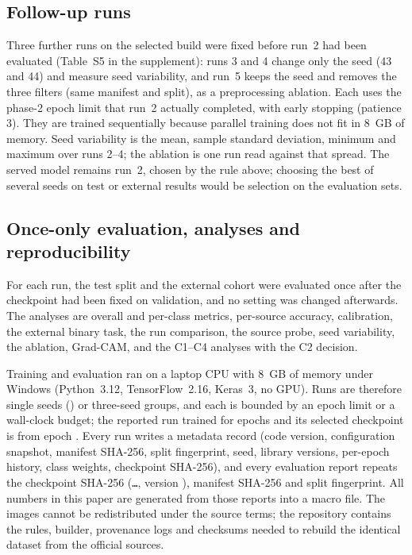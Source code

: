 \subsection{Follow-up runs}
\label{sec:followup}
Three further runs on the selected build were fixed before run~2 had been evaluated (Table~S5 in the supplement): runs 3 and 4 change only the seed (43 and 44) and measure seed variability, and run~5 keeps the seed and removes the three filters (same manifest and split), as a preprocessing ablation. Each uses the phase-2 epoch limit that run~2 actually completed, with early stopping (patience 3). They are trained sequentially because parallel training does not fit in 8~GB of memory. Seed variability is the mean, sample standard deviation, minimum and maximum over runs 2--4; the ablation is one run read against that spread. The served model remains run~2, chosen by the rule above; choosing the best of several seeds on test or external results would be selection on the evaluation sets.

\subsection{Once-only evaluation, analyses and reproducibility}
For each run, the test split and the external cohort were evaluated once after the checkpoint had been fixed on validation, and no setting was changed afterwards. The analyses are overall and per-class metrics, per-source accuracy, calibration, the external binary task, the run comparison, the source probe, seed variability, the ablation, Grad-CAM, and the C1--C4 analyses with the C2 decision.

Training and evaluation ran on a laptop CPU with 8~GB of memory under Windows (Python~3.12, TensorFlow~2.16, Keras~3, no GPU). Runs are therefore single seeds (\RSeed) or three-seed groups, and each is bounded by an epoch limit or a wall-clock budget; the reported run trained for \REpochsTrained{} epochs and its selected checkpoint is from epoch \RSelectedEpoch. Every run writes a metadata record (code version, configuration snapshot, manifest SHA-256, split fingerprint, seed, library versions, per-epoch history, class weights, checkpoint SHA-256), and every evaluation report repeats the checkpoint SHA-256 (\texttt{\RCheckpointShort\ldots}, version \RModelVersion), manifest SHA-256 and split fingerprint. All numbers in this paper are generated from those reports into a macro file. The images cannot be redistributed under the source terms; the repository contains the rules, builder, provenance logs and checksums needed to rebuild the identical dataset from the official sources.
